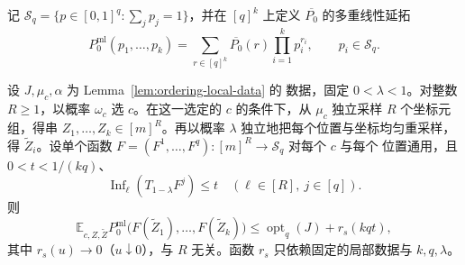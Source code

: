记 \(\mathcal S_q=\{p\in[0,1]^q:\sum_jp_j=1\}\)，并在 \([q]^k\)
上定义 \(\overline{P_0}\) 的多重线性延拓
\begin{equation}
 P_0^{\mathrm{ml}}(p_1,\ldots,p_k)
 =\sum_{r\in[q]^k}\overline{P_0}(r)
       \prod_{i=1}^k p_i^{r_i},
 \qquad p_i\in\mathcal S_q.
\label{eq:ordering-multilinear}
\end{equation}

\begin{lemma}[单纯形值的局部估计]\label{lem:ordering-rounding}
设 \(J,\mu_c,\alpha\) 为 Lemma~\ref{lem:ordering-local-data} 的
数据，固定 \(0<\lambda<1\)。对整数 \(R\ge1\)，以概率 \(\omega_c\)
选 \(c\)。在这一选定的 \(c\) 的条件下，从 \(\mu_c\) 独立采样
\(R\) 个坐标元组，得串 \(Z_1,\ldots,Z_k\in[m]^R\)。再以概率
\(\lambda\) 独立地把每个位置与坐标均匀重采样，得
\(\widetilde Z_i\)。设单个函数
\(F=(F^1,\ldots,F^q):[m]^R\to\mathcal S_q\) 对每个 \(c\) 与每个
位置通用，且 \(0<t<1/(kq)\)、
\[
 \operatorname{Inf}_\ell(T_{1-\lambda}F^j)\le t
 \quad(\ell\in[R],\ j\in[q]).
\]
则
\begin{equation}
 \mathbb E_{c,Z,\widetilde Z}
 P_0^{\mathrm{ml}}\bigl(F(\widetilde Z_1),\ldots,
                         F(\widetilde Z_k)\bigr)
 \le \operatorname{opt}_q(J)+r_s(kqt),
\label{eq:ordering-rounding}
\end{equation}
其中 \(r_s(u)\to0\)（\(u\downarrow0\)），与 \(R\) 无关。函数
\(r_s\) 只依赖固定的局部数据与 \(k,q,\lambda\)。
\end{lemma}

